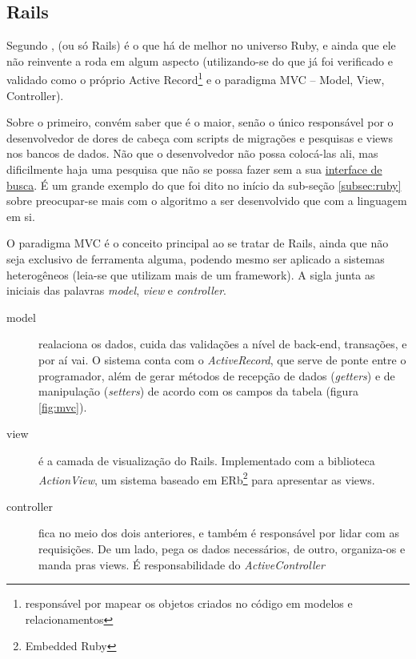 \subsection{Rails}
\label{subsec:rails}

Segundo \cite[p.~613]{Rcook:09},  (ou só Rails) é o que há de melhor
no universo Ruby, e ainda que ele não reinvente a roda em algum aspecto (utilizando-se
do que já foi verificado e validado como o próprio Active Record\footnote{responsável
por mapear os objetos criados no código em modelos e relacionamentos} e o paradigma MVC
-- Model, View, Controller).

Sobre o primeiro, convém saber que é o maior, senão o único responsável por 
o desenvolvedor de dores de cabeça com scripts de migrações e pesquisas e views nos
bancos de dados. Não que o desenvolvedor não possa colocá-las ali, mas dificilmente
haja uma pesquisa que não se possa fazer sem a sua
\href{https://guides.rubyonrails.org/active_record_querying.html}{interface de busca}.
É um grande exemplo do que foi dito no início da sub-seção \ref{subsec:ruby} sobre
preocupar-se mais com o algoritmo a ser desenvolvido que com a linguagem em si.

O paradigma MVC é o conceito principal ao se tratar de Rails, ainda que não seja exclusivo
de ferramenta alguma, podendo mesmo ser aplicado a sistemas heterogêneos (leia-se que
utilizam mais de um framework). A sigla junta as iniciais das palavras \emph{model},
\emph{view} e \emph{controller}.
\begin{description}
    \item[model] realaciona os dados, cuida das validações a nível de back-end, transações,
    e por aí vai. O sistema conta com o \emph{ActiveRecord}, que serve de ponte entre o
    programador, além de gerar métodos de recepção de dados (\emph{getters}) e de manipulação
    (\emph{setters}) de acordo com os campos da tabela (figura \ref{fig:mvc}).
    \item[view] é a camada de visualização do Rails. Implementado com a biblioteca
    \emph{ActionView}, um sistema baseado em ERb\footnote{Embedded Ruby} para apresentar as
    views.
    \item[controller] fica no meio dos dois anteriores, e também é responsável por lidar com
    as requisições. De um lado, pega os dados necessários, de outro, organiza-os e manda pras
    views. É responsabilidade do \emph{ActiveController}
\end{description}

